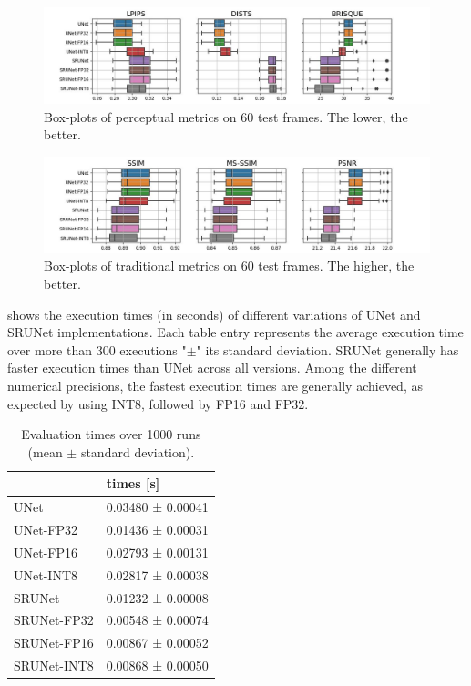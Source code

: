 \begin{figure}[ht]
\includegraphics[width=1.0\textwidth]{static/boxplots_perceptual_metrics.jpg}
\caption{Box-plots of perceptual metrics on 60 test frames. The lower, the better.}
\label{fig:metrics}
\end{figure}

\begin{figure}[ht]
\includegraphics[width=1.0\textwidth]{static/boxplots_traditional_metrics.jpg}
\caption{Box-plots of traditional metrics on 60 test frames. The higher, the better.}
\label{fig:metrics}
\end{figure}

 shows the execution times (in seconds) of different variations of UNet and SRUNet implementations. Each table entry represents the average execution time over more than 300 executions "$\pm$" its standard deviation. SRUNet generally has faster execution times than UNet across all versions. Among the different numerical precisions, the fastest execution times are generally achieved, as expected by using INT8, followed by FP16 and FP32.

\begin{table}[t]
\begin{tabular}{ll}
\toprule
{} &      times [s] \\
\midrule
UNet        &  0.03480 ± 0.00041 \\
UNet-FP32   &  0.01436 ± 0.00031 \\
UNet-FP16   &  0.02793 ± 0.00131 \\
UNet-INT8   &  0.02817 ± 0.00038 \\
SRUNet      &  0.01232 ± 0.00008 \\
SRUNet-FP32 &  0.00548 ± 0.00074 \\
SRUNet-FP16 &  0.00867 ± 0.00052 \\
SRUNet-INT8 &  0.00868 ± 0.00050 \\
\bottomrule
\end{tabular}
\caption{Evaluation times over 1000 runs (mean $\pm$ standard deviation).}
\label{tab:timings}
\end{table}

